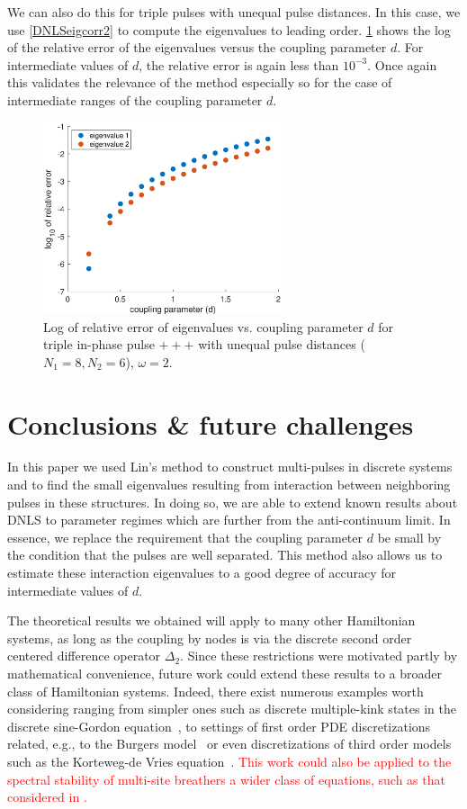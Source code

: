 \documentclass[12pt]{elsarticle}
\newcommand{\revised}[1]{ \textcolor{red}{#1} }
\begin{document}
We can also do this for triple pulses with unequal pulse distances. In this case, we use \cref{DNLSeigcorr2} to compute the eigenvalues to leading order. \cref{fig:error2} shows the log of the relative error of the eigenvalues versus the coupling parameter $d$.
For intermediate values of $d$, the relative error is again less than $10^{-3}$. Once again this validates the relevance
of the method especially so for the case of 
intermediate ranges of the coupling parameter $d$.

\begin{figure}
\centering
\includegraphics[width=7cm]{errors3.eps}
\caption{Log of relative error of eigenvalues vs. coupling parameter $d$ for triple in-phase pulse $+++$ with unequal pulse distances ($N_1 = 8, N_2 = 6$), $\omega = 2$.}
\label{fig:error2}
\end{figure}

\section{Conclusions \& future challenges}

In this paper we used Lin's method to construct multi-pulses in discrete systems and to find the small eigenvalues resulting from interaction between neighboring pulses in these structures. In doing so, we are able to extend known results about DNLS to parameter regimes which are further from the anti-continuum limit. In essence, we replace the requirement that the coupling parameter $d$ be small by the condition that the pulses are well separated. This method also allows us to estimate these interaction eigenvalues to a good degree of accuracy for intermediate values of $d$.

The theoretical results we obtained will apply to many other Hamiltonian systems, as long as the coupling by nodes is via the discrete second order centered difference operator $\Delta_2$. Since these restrictions were motivated partly by mathematical convenience, future work could extend these results to a broader class of Hamiltonian systems. Indeed, there exist numerous 
examples worth considering ranging from simpler
ones such as discrete multiple-kink states in 
the discrete sine-Gordon equation~\cite{peyrard},
to settings of first order PDE discretizations
related, e.g., to the Burgers model~\cite{turner}
or even discretizations of third order models
such as the Korteweg-de Vries equation~\cite{ohta}. \revised{This work could also be applied to the spectral stability of multi-site breathers a wider class of equations, such as that considered in \cite{Bountis2000}.}
\end{document}
